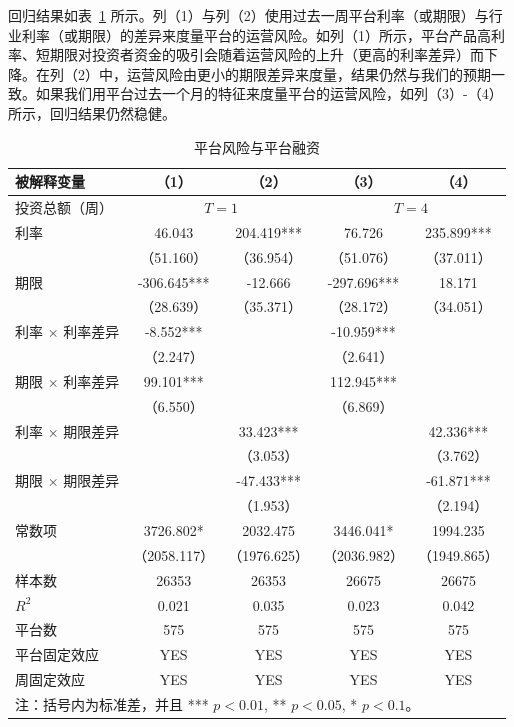 \documentclass[lang=cn,11pt]{elegantpaper}
\begin{document}
回归结果如表~\ref{tab:plat_risk} 所示。列（1）与列（2）使用过去一周平台利率（或期限）与行业利率（或期限）的差异来度量平台的运营风险。如列（1）所示，平台产品高利率、短期限对投资者资金的吸引会随着运营风险的上升（更高的利率差异）而下降。在列（2）中，运营风险由更小的期限差异来度量，结果仍然与我们的预期一致。如果我们用平台过去一个月的特征来度量平台的运营风险，如列（3）-（4）所示，回归结果仍然稳健。

\begin{table}[htbp]
\centering
\caption{平台风险与平台融资\label{tab:plat_risk}}
\begin{tabular}{lcccc}
\toprule
被解释变量 & （1）   & （2）   & （3）   & （4） \\
\midrule
投资总额（周） & \multicolumn{2}{c}{$T=1$} & \multicolumn{2}{c}{$T=4$} \\
\midrule
利率    & 46.043 & 204.419*** & 76.726 & 235.899*** \\
      & （51.160） & （36.954） & （51.076） & （37.011） \\
期限    & -306.645*** & -12.666 & -297.696*** & 18.171 \\
      & （28.639） & （35.371） & （28.172） & （34.051） \\
利率 $\times$ 利率差异 & -8.552*** &       & -10.959*** &  \\
      & （2.247） &       & （2.641） &  \\
期限 $\times$ 利率差异 & 99.101*** &       & 112.945*** &  \\
      & （6.550） &       & （6.869） &  \\
利率 $\times$ 期限差异 &       & 33.423*** &       & 42.336*** \\
      &       & （3.053） &       & （3.762） \\
期限 $\times$ 期限差异 &       & -47.433*** &       & -61.871*** \\
      &       & （1.953） &       & （2.194） \\
常数项   & 3726.802* & 2032.475 & 3446.041* & 1994.235 \\
      & （2058.117） & （1976.625） & （2036.982） & （1949.865） \\
样本数   & 26353 & 26353 & 26675 & 26675 \\
$R^2$    & 0.021 & 0.035 & 0.023 & 0.042 \\
平台数   & 575   & 575   & 575   & 575 \\
平台固定效应 & YES   & YES   & YES   & YES \\
周固定效应 & YES   & YES   & YES   & YES \\
\bottomrule
\multicolumn{5}{p{10cm}}{\scriptsize 注：括号内为标准差，并且 *** $p<0.01$, ** $p<0.05$, * $p<0.1$。}
\end{tabular}%
\end{table}%
\end{document}
